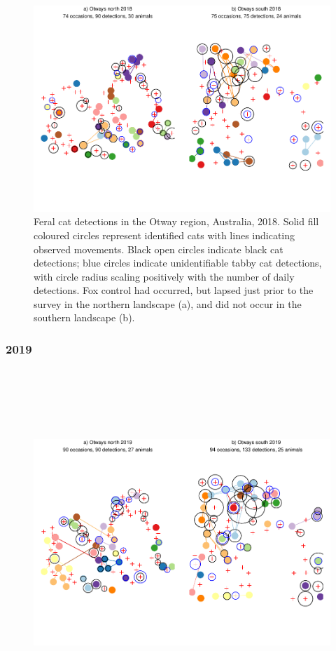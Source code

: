 \documentclass[11pt,a4paper,titlepage,twoside,openright]{style/unimelbthesis}
\begin{document}
\begin{mainmatter}
\(~\)

\(~\)
\begin{figure}

{\centering \includegraphics[width=1\linewidth]{figure/density-plot-ch-5-1} 

}

\caption{Feral cat detections in the Otway region, Australia, 2018. Solid fill coloured circles represent identified cats with lines indicating observed movements. Black open circles indicate black cat detections; blue circles indicate unidentifiable tabby cat detections, with circle radius scaling positively with the number of daily detections. Fox control had occurred, but lapsed just prior to the survey in the northern landscape (a), and did not occur in the southern landscape (b).}\label{fig:density-plot-ch-5}
\end{figure}
\newpage

\hypertarget{section-2}{%
\subsubsection{2019}\label{section-2}}

\(~\)

\(~\)

\(~\)
\begin{figure}

{\centering \includegraphics[width=1\linewidth]{figure/density-plot-ch-6-1} 

}
\end{figure}
\end{mainmatter}
\end{document}
